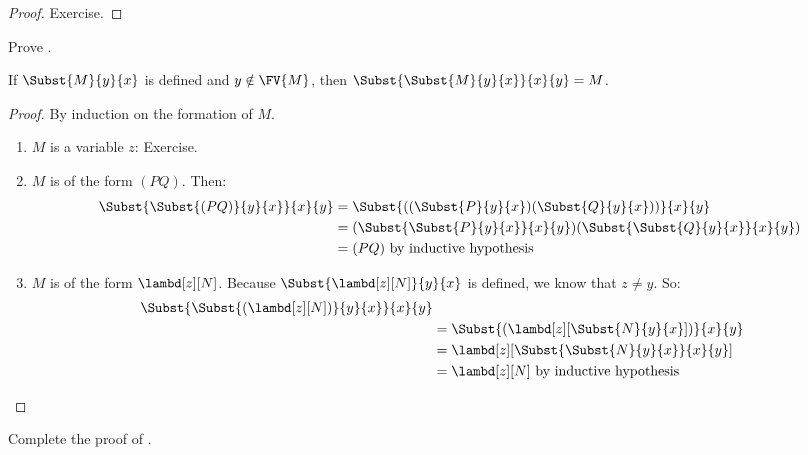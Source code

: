 \documentclass[../../../include/open-logic-section]{subfiles}
\begin{document}
\begin{proof}
  Exercise.
\end{proof}

\begin{prob}
  Prove .
\end{prob}


\begin{thm}
  If $\Subst{M}{y}{x}$ is defined and $y \notin \FV{M}$, then
  $\Subst{\Subst{M}{y}{x}}{x}{y} = M$.
\end{thm}

\begin{proof}
  By induction on the formation of $M$.
  \begin{enumerate}
  \item $M$ is a variable $z$: Exercise.
  \item $M$ is of the form $(PQ)$. Then:
    \begin{align*}
      \Subst{\Subst{(PQ)}{y}{x}}{x}{y}
      &=\Subst{((\Subst{P}{y}{x})(\Subst{Q}{y}{x}))}{x}{y} \\
      &= (\Subst{\Subst{P}{y}{x}}{x}{y})(\Subst{\Subst{Q}{y}{x}}{x}{y}) \\
      &= (PQ) \text{ by inductive hypothesis}
    \end{align*}
  \item $M$ is of the form $\lambd[z][N]$. Because
    $\Subst{\lambd[z][N]}{y}{x}$ is defined, we know
    that $z \neq y$. So:
    \begin{align*}
      \Subst{\Subst{(\lambd[z][N])}{y}{x}}{x}{y}\\
      & = \Subst{(\lambd[z][\Subst{N}{y}{x}])}{x}{y} \\
      & = \lambd[z][\Subst{\Subst{N}{y}{x}}{x}{y}] \\
      &= \lambd[z][N] \text{ by inductive hypothesis} 
    \end{align*}
  \end{enumerate}
\end{proof}

\begin{prob}
  Complete the proof of .
\end{prob}
\end{document}
